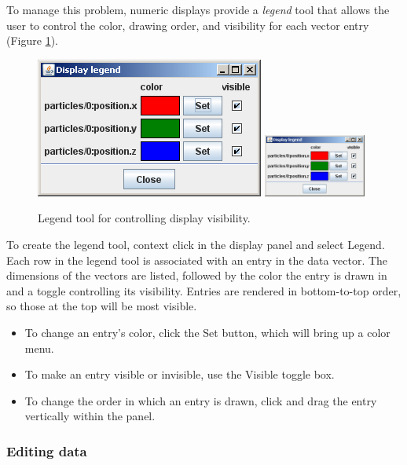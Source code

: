 \documentclass{article}
\begin{document}
To manage this problem, numeric displays provide a {\it legend} tool that
allows the user to control the color, drawing order, and visibility
for each vector entry (Figure \ref{legendFig}).

\begin{figure}
\begin{center}
\iflatexml
\includegraphics[]{images/legend}
\else
\includegraphics[width=0.30\textwidth]{images/legend}
\fi
\end{center}
\caption{Legend tool for controlling display visibility.}%
\label{legendFig}
\end{figure}

To create the legend tool, context click in the display panel and select
{\sf Legend}. Each row in the legend tool is associated with an entry in
the data vector. The dimensions of the vectors are listed, followed by 
the color the entry is drawn in and a toggle controlling its visibility.
Entries are rendered in bottom-to-top order, so those at the top will be
most visible.

\begin{itemize}

\item To change an entry's color, click the {\sf Set} button, which
will bring up a color menu.

\item To make an entry visible or invisible, use the {\sf Visible}
toggle box.

\item To change the order in which an entry is drawn, click and drag the
entry vertically within the panel.

\end{itemize}

\subsubsection{Editing data}
\end{document}
